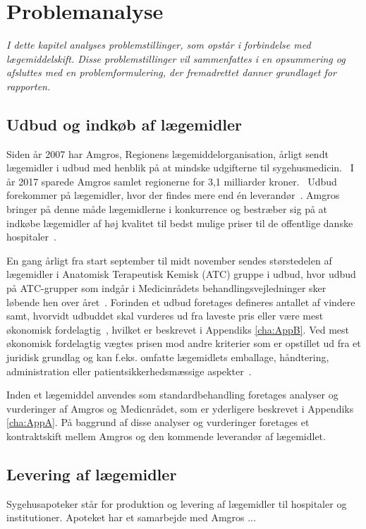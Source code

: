 \chapter{Problemanalyse}
\textit{I dette kapitel analyses problemstillinger, som opstår i forbindelse med lægemiddelskift. Disse problemstillinger vil sammenfattes i en opsummering og afsluttes med en problemformulering, der fremadrettet danner  grundlaget for rapporten.}

\section{Udbud og indkøb af lægemidler}
Siden år 2007 har Amgros, Regionens lægemiddelorganisation, årligt sendt lægemidler i udbud med henblik på at mindske udgifterne til sygehusmedicin.~\citep{Sygehusapoteket2017, Amgros2017} I år 2017 sparede Amgros samlet regionerne for 3,1 milliarder kroner.~\citep{Amgros2015} Udbud forekommer på lægemidler, hvor der findes mere end én leverandør~\citep{Amgros2015}. Amgros bringer på denne måde lægemidlerne i konkurrence og bestræber sig på at indkøbe lægemidler af høj kvalitet til bedst mulige priser til de offentlige danske hospitaler~\citep{Amgros2015}.

En gang årligt fra start september til midt november sendes størstedelen af lægemidler i Anatomisk Terapeutisk Kemisk (ATC) gruppe i udbud, hvor udbud på ATC-grupper som indgår i Medicinrådets behandlingsvejledninger sker løbende hen over året~\citep{Sygehusapoteket2017}. Forinden et udbud foretages defineres antallet af vindere samt, hvorvidt udbuddet skal vurderes ud fra laveste pris eller være mest økonomisk fordelagtig~\citep{Amgros2018a}, hvilket er beskrevet i Appendiks \ref{cha:AppB}. Ved mest økonomisk fordelagtig vægtes prisen mod andre kriterier som er opstillet ud fra et juridisk grundlag og kan f.eks. omfatte lægemidlets emballage, håndtering, administration eller patientsikkerhedsmæssige aspekter~\citep{Amgros2018a}.

Inden et lægemiddel anvendes som standardbehandling foretages analyser og vurderinger af Amgros og Medicnrådet, som er yderligere beskrevet i Appendiks \ref{cha:AppA}. På baggrund af disse analyser og vurderinger foretages et kontraktskift mellem Amgros og den kommende leverandør af lægemidlet.

\section{Levering af lægemidler}
Sygehusapoteker står for produktion og levering af lægemidler til hospitaler og institutioner. Apoteket har et samarbejde med Amgros ...

